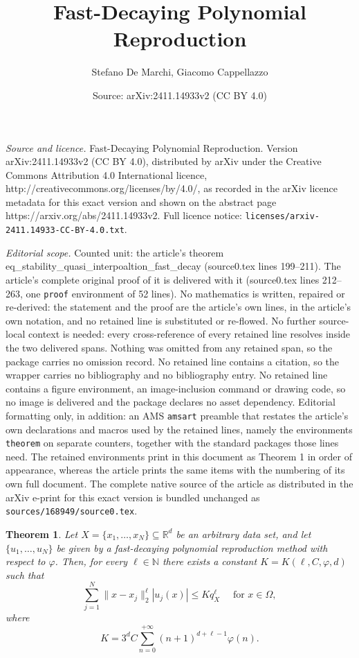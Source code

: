 \documentclass[10pt,a4paper]{amsart}
\title{Fast-Decaying Polynomial Reproduction}
\author{Stefano De Marchi, Giacomo Cappellazzo}
\date{Source: arXiv:2411.14933v2 (CC BY 4.0)}
\newtheorem{theorem}{Theorem}
\begin{document}
\maketitle

\noindent\emph{Source and licence.} Fast-Decaying Polynomial Reproduction. Version arXiv:2411.14933v2 (CC BY 4.0), distributed by arXiv under the Creative Commons Attribution 4.0 International licence, http://creativecommons.org/licenses/by/4.0/, as recorded in the arXiv licence metadata for this exact version and shown on the abstract page https://arxiv.org/abs/2411.14933v2. Full licence notice: \texttt{licenses/arxiv-2411.14933-CC-BY-4.0.txt}.\par\smallskip

\noindent\textit{Editorial scope.} Counted unit: the article's theorem eq\_stability\_quasi\_interpoaltion\_fast\_decay (source0.tex lines 199--211). The article's complete original proof of it is delivered with it (source0.tex lines 212--263, one \texttt{proof} environment of 52 lines). No mathematics is written, repaired or re-derived: the statement and the proof are the article's own lines, in the article's own notation, and no retained line is substituted or re-flowed.  No further source-local context is needed: every cross-reference of every retained line resolves inside the two delivered spans.  Nothing was omitted from any retained span, so the package carries no omission record.  No retained line contains a citation, so the wrapper carries no bibliography and no bibliography entry.  No retained line contains a figure environment, an image-inclusion command or drawing code, so no image is delivered and the package declares no asset dependency.  Editorial formatting only, in addition: an AMS \texttt{amsart} preamble that restates the article's own declarations and macros used by the retained lines, namely the environments \texttt{theorem} on separate counters, together with the standard packages those lines need.  The retained environments print in this document as Theorem 1 in order of appearance, whereas the article prints the same items with the numbering of its own full document.  The complete native source of the article as distributed in the arXiv e-print for this exact version is bundled unchanged as \texttt{sources/168949/source0.tex}.
\begin{theorem}
    Let $X=\{x_1,\dots,x_N\} \subseteq \mathbb{R}^d$ be an arbitrary data set, and let $\{u_1,\dots,u_N\}$ be given by a fast-decaying polynomial reproduction method with respect to $\varphi$. Then, for every $\ell \in \mathbb{N}$ there exists a constant $K=K(\ell,C,\varphi,d)$ such that 
    \begin{equation}
        \sum_{j=1}^{N} \|x-x_j\|_2^{\ell} |u_j(x)| \leq K q_{X}^{\ell} \quad \textrm{ for } x \in \Omega,
         \label{eq_stability_quasi_interpoaltion_fast_decay}
    \end{equation}
    where
    \begin{equation}
        K=3^d C \sum_{n=0}^{+\infty} (n+1)^{d+\ell-1}\varphi(n).
        \label{def_constant_K_stability}
    \end{equation}
    \label{thm_stability_quasi_interpoaltion_fast_decay}
\end{theorem}
\end{document}
